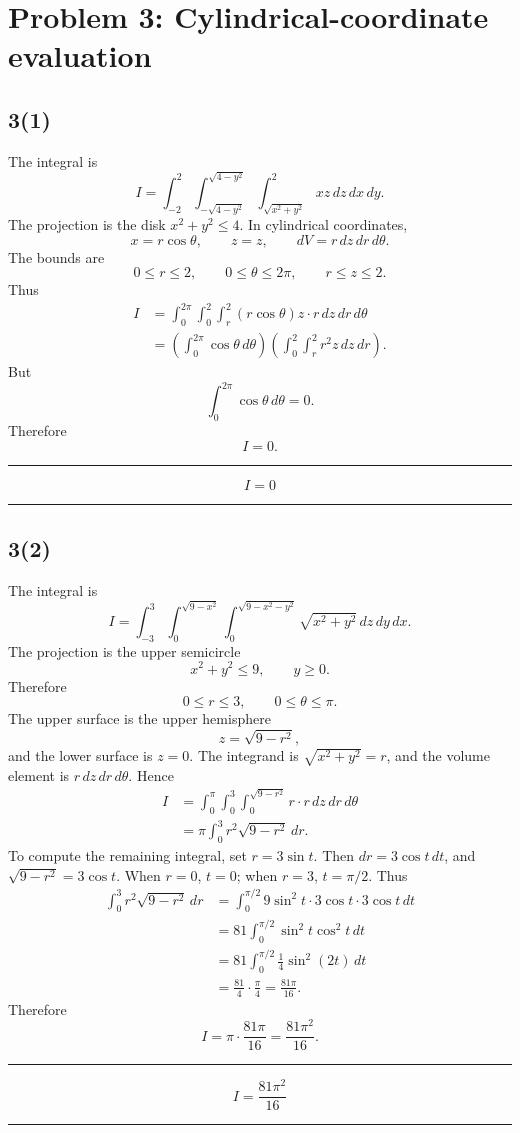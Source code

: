 \documentclass[11pt,a4paper]{article}
\newenvironment{resultbox}{\par\medskip\noindent\begin{minipage}{\linewidth}\hrule\smallskip}{\smallskip\hrule\end{minipage}\par\medskip}
\newcommand{\ans}[1]{\begin{resultbox}\[\boxed{#1}\]\end{resultbox}}
\begin{document}
\section{Problem 3: Cylindrical-coordinate evaluation}

\subsection*{3(1)}
The integral is
\[
I=\int_{-2}^2\int_{-\sqrt{4-y^2}}^{\sqrt{4-y^2}}
\int_{\sqrt{x^2+y^2}}^2xz\,dz\,dx\,dy.
\]
The projection is the disk \(x^2+y^2\le4\). In cylindrical coordinates,
\[
x=r\cos\theta,
\qquad z=z,
\qquad dV=r\,dz\,dr\,d\theta.
\]
The bounds are
\[
0\le r\le2,
\qquad 0\le\theta\le2\pi,
\qquad r\le z\le2.
\]
Thus
\begin{align*}
I&=\int_0^{2\pi}\int_0^2\int_r^2(r\cos\theta)z\cdot r\,dz\,dr\,d\theta\\
&=\left(\int_0^{2\pi}\cos\theta\,d\theta\right)
\left(\int_0^2\int_r^2r^2z\,dz\,dr\right).
\end{align*}
But
\[
\int_0^{2\pi}\cos\theta\,d\theta=0.
\]
Therefore
\[
I=0.
\]
\ans{I=0}

\subsection*{3(2)}
The integral is
\[
I=\int_{-3}^{3}\int_0^{\sqrt{9-x^2}}
\int_0^{\sqrt{9-x^2-y^2}}\sqrt{x^2+y^2}\,dz\,dy\,dx.
\]
The projection is the upper semicircle
\[
x^2+y^2\le9,
\qquad y\ge0.
\]
Therefore
\[
0\le r\le3,
\qquad 0\le\theta\le\pi.
\]
The upper surface is the upper hemisphere
\[
z=\sqrt{9-r^2},
\]
and the lower surface is \(z=0\). The integrand is \(\sqrt{x^2+y^2}=r\), and the volume element is \(r\,dz\,dr\,d\theta\). Hence
\begin{align*}
I&=\int_0^\pi\int_0^3\int_0^{\sqrt{9-r^2}}r\cdot r\,dz\,dr\,d\theta\\
&=\pi\int_0^3r^2\sqrt{9-r^2}\,dr.
\end{align*}
To compute the remaining integral, set \(r=3\sin t\). Then \(dr=3\cos t\,dt\), and \(\sqrt{9-r^2}=3\cos t\). When \(r=0\), \(t=0\); when \(r=3\), \(t=\pi/2\). Thus
\begin{align*}
\int_0^3r^2\sqrt{9-r^2}\,dr
&=\int_0^{\pi/2}9\sin^2t\cdot3\cos t\cdot3\cos t\,dt\\
&=81\int_0^{\pi/2}\sin^2t\cos^2t\,dt\\
&=81\int_0^{\pi/2}\frac14\sin^2(2t)\,dt\\
&=\frac{81}{4}\cdot\frac\pi4=\frac{81\pi}{16}.
\end{align*}
Therefore
\[
I=\pi\cdot\frac{81\pi}{16}=\frac{81\pi^2}{16}.
\]
\ans{I=\frac{81\pi^2}{16}}
\end{document}
